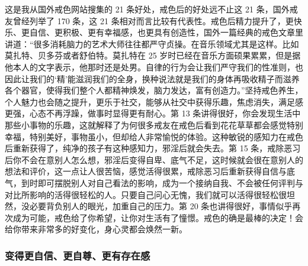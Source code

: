 这是我从国外戒色网站搜集的 21 条好处，戒色后的好处远不止这 21 条，国外戒友曾经列举了 170 条，这 21 条相对而言比较有代表性。戒色后精力提升了，更快乐、更自信、更积极、更有幸福感，也更具有创造性，国外一篇经典的戒色文章里讲道：“很多消耗脑力的艺术大师往往都严守贞操。在音乐领域尤其是这样。比如莫扎特、贝多芬或者舒伯特。莫扎特在 25 岁时已经在音乐方面硕果累累，但是据他本人的文字表示，他那时还是处男。自律的行为会让我们严守我们的性准则，也因此让我们的‘精’能滋润我们的全身，换种说法就是我们的身体再吸收精子而滋养各个器官，使得我们整个人都精神焕发，脑力发达，富有创造力。”坚持戒色养生，个人魅力也会随之提升，更乐于社交，能够从社交中获得乐趣，焦虑消失，满足感更强，心态不再浮躁，做事时显得更有耐心。第 13 条讲得很好，你会发现生活中那些小事物的乐趣，这就解释了为何很多戒友在戒色后看到花花草草都会感觉特别幸福，特别美好，事物虽小，但却给人非常愉悦的体验。这种敏锐的感知力在戒色后重新获得了，纯净的孩子有这种感知力，邪淫后就会失去。第 15 条，戒除恶习后你不会在意别人怎么想，邪淫后变得自卑、底气不足，这时候就会很在意别人的想法和评价，这一点让人很苦恼，感觉活得很累，戒除恶习后重新获得自信与底气，到时即可摆脱别人对自己看法的影响，成为一个接纳自我、不会被任何评判与对比所影响的活得很轻松的人。只要自己问心无愧，我们就可以活得很轻松很坦然，没必要背负别人的眼光，加重自己的压力。第 20 条也讲得很好，事情似乎再次成为可能，戒色给了你希望，让你对生活有了憧憬。戒色的确是最棒的决定！会给你带来非常多的好变化，身心灵都会焕然一新。

\subsubsection{变得更自信、更自尊、更有存在感}


